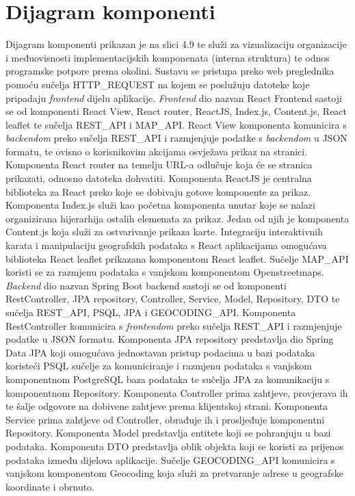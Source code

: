 \eject
\section{Dijagram komponenti}

Dijagram komponenti prikazan je na slici 4.9 te služi za vizualizaciju organizacije i međuovisnosti implementacijskih
komponenata (interna struktura) te odnos programske potpore prema okolini. Sustavu se pristupa preko web preglednika pomoću sučelja HTTP\_REQUEST
na kojem se poslužuju datoteke koje pripadaju \textit{frontend} dijelu aplikacije. \textit{Frontend} dio nazvan React Frontend
sastoji se od komponenti React View, React router, ReactJS, Index.js, Content.js, React leaflet te sučelja REST\_API i MAP\_API.
React View komponenta komunicira s \textit{backendom} preko sučelja REST\_API i razmjenjuje podatke s \textit{backendom} u
JSON formatu, te ovisno o korisnikovim akcijama osvježava prikaz na stranici. Komponenta React router na temelju URL-a
odlučuje koja će se stranica prikazati, odnosno datoteka dohvatiti. Komponenta ReactJS je centralna biblioteka za React
preko koje se dobivaju gotove komponente za prikaz. Komponenta Index.js služi kao početna komponenta unutar koje se nalazi
organizirana hijerarhija ostalih elemenata za prikaz. Jedan od njih je komponenta Content.js koja služi za ostvarivanje
prikaza karte. Integraciju interaktivnih karata i manipulaciju geografskih podataka s React aplikacijama omogućava biblioteka
React leaflet prikazana komponentom React leaflet. Sučelje MAP\_API koristi se za razmjenu podataka s vanjskom komponentom
Openstreetmaps. \textit{Backend} dio nazvan Spring Boot backend sastoji se od komponenti RestController, JPA repository,
Controller, Service, Model, Repository, DTO te sučelja REST\_API, PSQL, JPA i GEOCODING\_API. Komponenta RestController komunicira
s \textit{frontendom} preko sučelja REST\_API i razmjenjuje podatke u JSON formatu. Komponenta JPA repository predstavlja
dio Spring Data JPA koji omogućava jednostavan pristup podacima u bazi podataka koristeći PSQL sučelje za komuniciranje i
razmjenu podataka s vanjskom komponentnom PostgreSQL baza podataka te sučelja JPA za komunikaciju s komponentnom Repository.
Komponenta Controller prima zahtjeve, provjerava ih te šalje odgovore na dobivene zahtjeve prema klijentskoj strani. Komponenta
Service prima zahtjeve od Controller, obrađuje ih i prosljeđuje komponentni Repository. Komponenta Model predstavlja entitete
koji se pohranjuju u bazi podataka. Komponenta DTO predstavlja oblik objekta koji se koristi za prijenos podataka između
dijelova aplikacije. Sučelje GEOCODING\_API komunicira s vanjskom komponentom Geocoding koja služi za pretvaranje adrese
u geografske koordinate i obrnuto.


